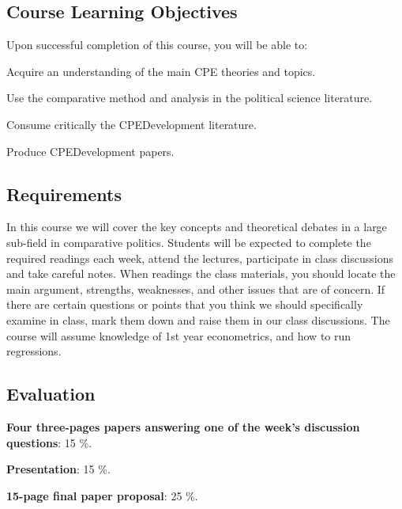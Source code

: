 \documentclass[letterpaper]{article}
\renewenvironment{itemize}{
  \begin{list}{}{
    \setlength{\leftmargin}{1.5em}
  }
}{
  \end{list}
}
\begin{document}
\subsection*{Course Learning Objectives}
 
Upon successful completion of this course, you will be able to:

\begin{itemize}
	\item[$\bullet$] Acquire an understanding of the main CPE theories and topics.
	\item[$\bullet$] Use the comparative method and analysis in the political science literature.
	\item[$\bullet$] Consume critically the CPE\/Development literature.
	\item[$\bullet$] Produce CPE\/Development papers.
\end{itemize}



\subsection*{Requirements}

In this course we will cover the key concepts and theoretical debates in a large sub-field in comparative politics. Students will be expected to complete the required readings each week, attend the lectures, participate in class discussions and take careful notes. When readings the class materials, you should locate the main argument, strengths, weaknesses, and other issues that are of concern. If there are certain questions or points that you think we should specifically examine in class, mark them down and raise them in our class discussions. The course will assume knowledge of 1st year econometrics, and how to run regressions.

\subsection*{Evaluation}


\begin{itemize}
	\item[$\bullet$] {\bf Four three-pages papers answering one of the week's discussion questions}: 15 \%.
	\item[$\bullet$] {\bf Presentation}: 15 \%.
	\item[$\bullet$] {\bf 15-page final paper proposal}: 25 \%.
\end{itemize}
\end{document}
